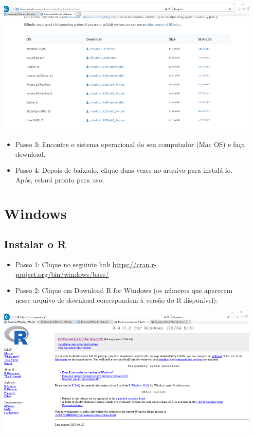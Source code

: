 \documentclass[
  brazil,
]{book}
\providecommand{\tightlist}{%
  \setlength{\itemsep}{0pt}\setlength{\parskip}{0pt}}
\begin{document}
\includegraphics[width=13.54in]{img/inst_1_rstudio}

\begin{itemize}
\tightlist
\item
  Passo 3: Encontre o sistema operacional do seu computador (Mac OS) e faça download.\\
\item
  Passo 4: Depois de baixado, clique duas vezes no arquivo para instalá-lo. Após, estará pronto para uso.
\end{itemize}

\hypertarget{windows}{%
\section{Windows}\label{windows}}

\hypertarget{instalar-o-r-2}{%
\subsection{Instalar o R}\label{instalar-o-r-2}}

\begin{itemize}
\tightlist
\item
  Passo 1: Clique no seguinte link \url{https://cran.r-project.org/bin/windows/base/}\\
\item
  Passo 2: Clique em Download R for Windows (os números que aparecem nesse arquivo de download correspondem à versão do R disponível):
\end{itemize}

\includegraphics[width=13.54in]{img/inst_1_rwindows}
\end{document}

